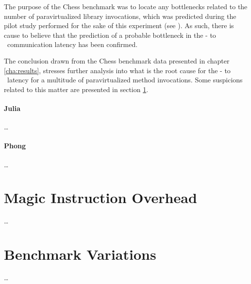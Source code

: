 The purpose of the Chess benchmark was to locate any bottlenecks related to the number of paravirtualized library invocations, which was predicted during the pilot study performed for the sake of this experiment (see ).
As such, there is cause to believe that the prediction of a probable bottleneck in the \dvttermtarget - to \dvttermhost\ communication latency has been confirmed.

The conclusion drawn from the Chess benchmark data presented in chapter \ref{cha:results}, stresses further analysis into what is the root cause for the \dvttermtarget - to \dvttermhost\ latency for a multitude of paravirtualized method invocations.
Some suspicions related to this matter are presented in section \ref{sec:analysisexperiment_magicinstructionoverhead}. 


\paragraph{Julia}
\label{par:analysisexperiment_julia}
\ldots

\paragraph{Phong}
\label{par:analysisexperiment_phong}
\ldots

\section{Magic Instruction Overhead}
\label{sec:analysisexperiment_magicinstructionoverhead}
\ldots


\section{Benchmark Variations}
\label{sec:analysisexperiment_benchmarkvariations}
\ldots



